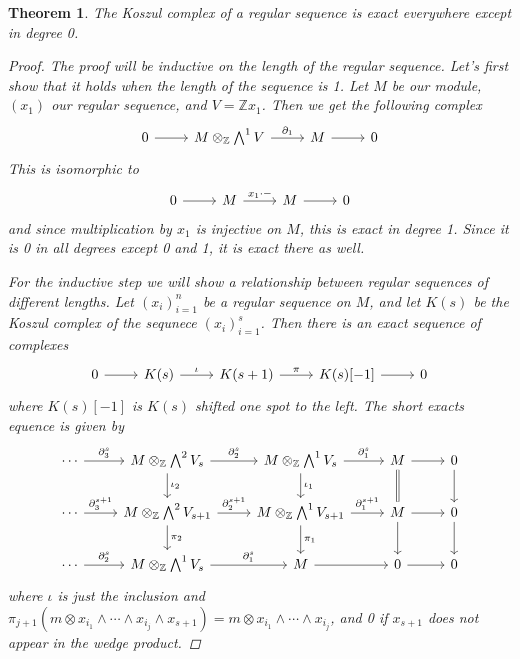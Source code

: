 \documentclass[11pt, a4paper, english]{article}
\numberwithin{prop}{section}
\numberwithin{lemma}{section}
\newtheorem{theorem}{Theorem}
\numberwithin{theorem}{section}
\numberwithin{defin}{section}
\numberwithin{example}{section}
\newcommand{\Z}{\mathbb{Z}}
\begin{document}
\begin{theorem}
The Koszul complex of a regular sequence is exact everywhere except in degree 0.
\begin{proof}
The proof will be inductive on the length of the regular sequence. Let's first show that it holds when the length of the sequence is 1. Let $M$ be our module, $(x_1)$ our regular sequence, and $V = \Z x_1$. Then we get the following complex
\begin{equation*}
\begin{tikzcd}
0 \arrow[r] & M \otimes_\Z \bigwedge^1 V \arrow{r}{\partial_1} & M \arrow[r] & 0
\end{tikzcd}
\end{equation*}
This is isomorphic to 
\begin{equation*}
\begin{tikzcd}
0 \arrow[r] & M\arrow{r}{x_1 \cdot -} & M \arrow[r] & 0
\end{tikzcd}
\end{equation*}
and since multiplication by $x_1$ is injective on $M$, this is exact in degree 1. Since it is 0 in all degrees except 0 and 1, it is exact there as well. 

For the inductive step we will show a relationship between regular sequences of different lengths. Let $(x_i)_{i=1}^{n}$ be a regular sequence on $M$, and let $K(s)$ be the Koszul complex of the sequnece $(x_i)_{i=1}^s$. Then there is an exact sequence of complexes
\begin{equation*}
\begin{tikzcd}
0 \arrow[r] & K(s) \arrow{r}{\iota} & K(s+1) \arrow{r}{\pi} & K(s)[-1] \arrow{r} & 0
\end{tikzcd}
\end{equation*}
where $K(s)[-1]$ is $K(s)$ shifted one spot to the left. The short exacts equence is given by
\begin{equation*}
\begin{tikzcd}
\cdots \arrow{r}{\partial_3^s} & 
M \otimes_\Z \bigwedge^2 V_s \arrow{r}{\partial_2^s} \arrow{d}{\iota_2} & 
M \otimes_\Z \bigwedge^1 V_s \arrow{r}{\partial_1^s} \arrow{d}{\iota_1} & 
M \arrow[r] \arrow[d, equal] & 0 \arrow[d]\\
\cdots \arrow{r}{\partial_3^{s+1}} & 
M \otimes_\Z \bigwedge^2 V_{s+1}\arrow{r}{\partial_2^{s+1}} \arrow{d}{\pi_2} & 
M \otimes_\Z \bigwedge^1 V_{s+1} \arrow{r}{\partial_1^{s+1}} \arrow{d}{\pi_1} & 
M \arrow[r] \arrow[d] &  0 \arrow[d]\\
\cdots \arrow{r}{\partial_2^s} & 
M \otimes_\Z \bigwedge^1 V_s \arrow{r}{\partial_1^s} & 
M \arrow[r] & 0 \arrow[r] & 0
\end{tikzcd}
\end{equation*}
where $\iota$ is just the inclusion and $\pi_{j+1}(m \otimes x_{i_1} \wedge \cdots \wedge x_{i_{j}} \wedge x_{s+1}) = m \otimes x_{i_1} \wedge \cdots \wedge x_{i_{j}}$, and 0 if $x_{s+1}$ does not appear in the wedge product.


\end{proof}
\end{theorem}
\end{document}
